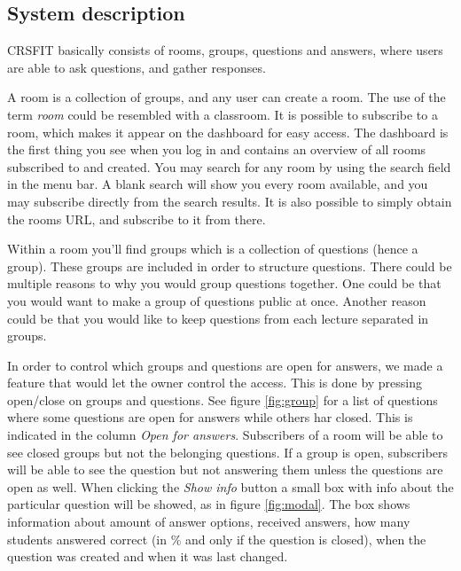 \subsection{System description}

CRSFIT basically consists of rooms, groups, questions and answers, where users are able to ask questions, and gather responses.

A room is a collection of groups, and any user can create a room. The use of the term \emph{room} could be resembled with a classroom. It is possible to subscribe to a room, which makes it appear on the dashboard for easy access. The dashboard is the first thing you see when you log in and contains an overview of all rooms subscribed to and created. You may search for any room by using the search field in the menu bar. A blank search will show you every room available, and you may subscribe directly from the search results. It is also possible to simply obtain the rooms URL, and subscribe to it from there.

Within a room you'll find groups which is a collection of questions (hence a group). These groups are included in order to structure questions. There could be multiple reasons to why you would group questions together. One could be that you would want to make a group of questions public at once. Another reason could be that you would like to keep questions from each lecture separated in groups.

In order to control which groups and questions are open for answers, we made a feature that would let the owner control the access. This is done by pressing open/close on groups and questions. See figure \ref{fig:group} for a list of questions where some questions are open for answers while others har closed. This is indicated in the column \emph{Open for answers}. Subscribers of a room will be able to see closed groups but not the belonging questions. If a group is open, subscribers will be able to see the question but not answering them unless the questions are open as well. When clicking the \emph{Show info} button a small box with info about the particular question will be showed, as in figure \ref{fig:modal}. The box shows information about amount of answer options, received answers, how many students answered correct (in \% and only if the question is closed), when the question was created and when it was last changed.

